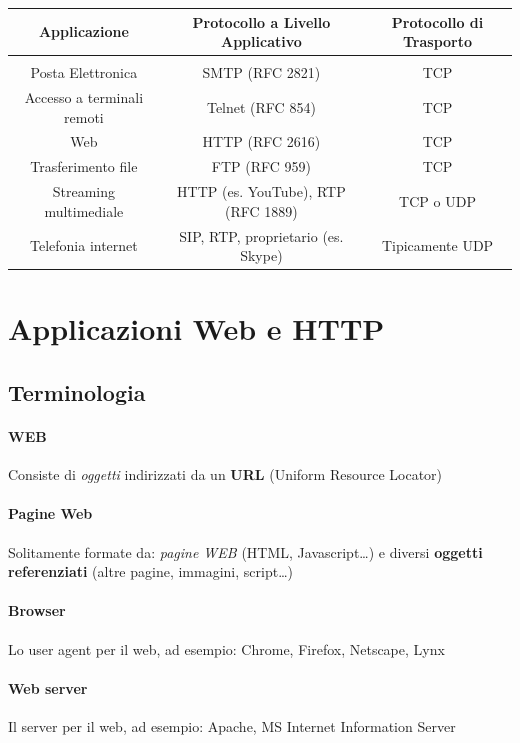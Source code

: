 \documentclass[10pt]{article}
\begin{document}
\begin{center}
\begin{tabbing}
\begin{tabular}{c | c c }
\textbf{Applicazione} & \textbf{Protocollo a Livello Applicativo} & \textbf{Protocollo di Trasporto}\\\hline\\
Posta Elettronica & SMTP (RFC 2821) & TCP\\
Accesso a terminali remoti & Telnet (RFC 854) & TCP\\
Web & HTTP (RFC 2616) & TCP\\
Trasferimento file & FTP (RFC 959) & TCP\\
Streaming multimediale & HTTP (es. YouTube), RTP (RFC 1889) & TCP o UDP\\
Telefonia internet & SIP, RTP, proprietario (es. Skype) & Tipicamente UDP
\end{tabular}
\end{tabbing}
\end{center}
\section{Applicazioni Web e HTTP}
\subsection{Terminologia}
\paragraph{WEB} Consiste di \textit{oggetti} indirizzati da un \textbf{URL} (Uniform Resource Locator)
\paragraph{Pagine Web} Solitamente formate da: \textit{pagine WEB} (HTML, Javascript\ldots) e diversi \textbf{oggetti referenziati} (altre pagine, immagini, script\ldots)
\paragraph{Browser} Lo user agent per il web, ad esempio: Chrome, Firefox, Netscape, Lynx
\paragraph{Web server} Il server per il web, ad esempio: Apache, MS Internet Information Server
\end{document}
